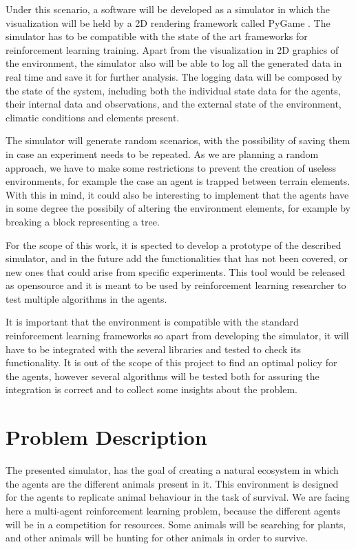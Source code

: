 Under this scenario, a software will be developed as a simulator in which the visualization will be held by a 2D rendering framework called PyGame \cite{pygame}. The simulator has to be compatible with the state of the art frameworks for reinforcement learning training. Apart from the visualization in 2D graphics of the environment, the simulator also will be able to log all the generated data in real time and save it for further analysis. The logging data will be composed by the state of the system, including both the individual state data for the agents, their internal data and observations, and the external state of the environment, climatic conditions and elements present.

The simulator will generate random scenarios, with the possibility of saving them in case an experiment needs to be repeated. As we are planning a random approach, we have to make some restrictions to prevent the creation of useless environments, for example the case an agent is trapped between terrain elements. With this in mind, it could also be interesting to implement that the agents have in some degree the possibily of altering the environment elements, for example by breaking a block representing a tree.

For the scope of this work, it is spected to develop a prototype of the described simulator, and in the future add the functionalities that has not been covered, or new ones that could arise from specific experiments. This tool would be released as opensource and it is meant to be used by reinforcement learning researcher to test multiple algorithms in the agents.

It is important that the environment is compatible with the standard reinforcement learning frameworks so apart from developing the simulator, it will have to be integrated with the several libraries and tested to check its functionality. It is out of the scope of this project to find an optimal policy for the agents, however several algorithms will be tested both for assuring the integration is correct and to collect some insights about the problem.

\section{Problem Description}

The presented simulator, has the goal of creating a natural ecosystem in which the agents are the different animals present in it. This environment is designed for the agents to replicate animal behaviour in the task of survival. We are facing here a multi-agent reinforcement learning problem, because the different agents will be in a competition for resources. Some animals will be searching for plants, and other animals will be hunting for other animals in order to survive.

